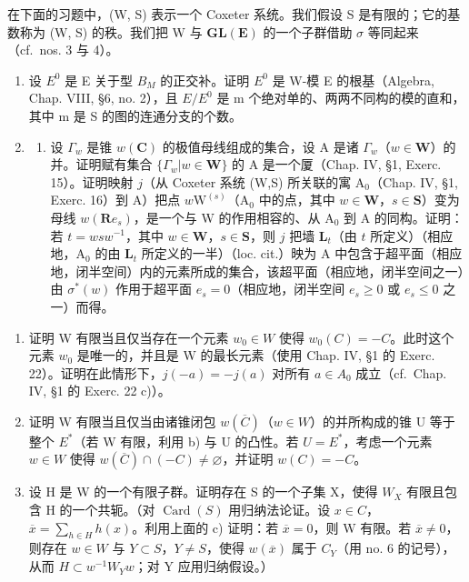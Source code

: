 
在下面的习题中，(W, S) 表示一个 Coxeter 系统。我们假设 S 是有限的；它的基数称为 (W, S) 的秩。我们把 W 与 \(\mathbf{GL}(\mathbf{E})\) 的一个子群借助 \(\sigma\) 等同起来（cf.~nos. 3 与 4）。

\begin{enumerate}
\def\labelenumi{\arabic{enumi})}
\item
  设 \(E^{0}\) 是 E 关于型 \(B_{M}\) 的正交补。证明 \(E^{0}\) 是 W-模 E 的根基（Algebra, Chap. VIII, §6, no. 2），且 \(E/E^{0}\) 是 m 个绝对单的、两两不同构的模的直和，其中 m 是 S 的图的连通分支的个数。
\item
  \begin{enumerate}
  \def\labelenumii{\alph{enumii})}
  \tightlist
  \item
    设 \(\Gamma_w\) 是锥 \(w(\mathbf{C})\) 的极值母线组成的集合，设 A 是诸 \(\Gamma_w\)（\(w \in \mathbf{W}\)）的并。证明赋有集合 \(\{\Gamma_w | w \in \mathbf{W}\}\) 的 A 是一个厦（Chap. IV, §1, Exerc. 15）。证明映射 \(j\)（从 Coxeter 系统 (W,S) 所关联的寓 \(\mathrm{A}_0\)（Chap. IV, §1, Exerc. 16）到 A）把点 \(w\mathrm{W}^{(s)}\)（\(\mathrm{A}_0\) 中的点，其中 \(w \in \mathbf{W}\)，\(s \in \mathbf{S}\)）变为母线 \(w(\mathbf{R}e_s)\)，是一个与 W 的作用相容的、从 \(\mathrm{A}_0\) 到 A 的同构。证明：若 \(t = wsw^{-1}\)，其中 \(w \in \mathbf{W}\)，\(s \in \mathbf{S}\)，则 \(j\) 把墙 \(\mathbf{L}_t\)（由 \(t\) 所定义）（相应地，\(\mathrm{A}_0\) 的由 \(\mathbf{L}_t\) 所定义的一半）（loc. cit.）映为 A 中包含于超平面（相应地，闭半空间）内的元素所成的集合，该超平面（相应地，闭半空间之一）由 \(\sigma^*(w)\) 作用于超平面 \(e_s = 0\)（相应地，闭半空间 \(e_s \geqslant 0\) 或 \(e_s \leqslant 0\) 之一）而得。
  \end{enumerate}
\end{enumerate}

\begin{enumerate}
\def\labelenumi{\alph{enumi})}
\setcounter{enumi}{1}
\item
  证明 W 有限当且仅当存在一个元素 \(w_{0} \in W\) 使得 \(w_{0}(C) = -C\)。此时这个元素 \(w_{0}\) 是唯一的，并且是 W 的最长元素（使用 Chap. IV, §1 的 Exerc. 22）。证明在此情形下，\(j(-a) = -j(a)\) 对所有 \(a \in A_{0}\) 成立（cf.~Chap. IV, §1 的 Exerc. 22 c)）。
\item
  证明 W 有限当且仅当由诸锥闭包 \(w(\overline{C})\)（\(w \in W\)）的并所构成的锥 U 等于整个 \(E^{*}\)（若 W 有限，利用 b) 与 U 的凸性。若 \(U = E^{*}\)，考虑一个元素 \(w \in W\) 使得 \(w(\overline{C}) \cap (-C) \neq \varnothing\)，并证明 \(w(C) = -C\)。
\item
  设 H 是 W 的一个有限子群。证明存在 S 的一个子集 X，使得 \(W_{X}\) 有限且包含 H 的一个共轭。（对 \(\operatorname{Card}(S)\) 用归纳法论证。设 \(x \in C\)，\(\overline{x} = \sum_{h \in H} h(x)\)。利用上面的 c) 证明：若 \(\overline{x} = 0\)，则 W 有限。若 \(\overline{x} \neq 0\)，则存在 \(w \in W\) 与 \(Y \subset S\)，\(Y \neq S\)，使得 \(w(\overline{x})\) 属于 \(C_{Y}\)（用 no. 6 的记号），从而 \(H \subset w^{-1}W_{Y}w\)；对 Y 应用归纳假设。）
\end{enumerate}

